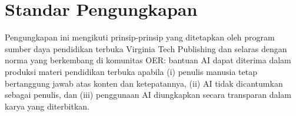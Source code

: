 \section*{Standar Pengungkapan}

Pengungkapan ini mengikuti prinsip-prinsip yang ditetapkan oleh program
sumber daya pendidikan terbuka Virginia Tech Publishing dan selaras dengan
norma yang berkembang di komunitas OER: bantuan AI dapat diterima dalam
produksi materi pendidikan terbuka apabila (i) penulis manusia tetap
bertanggung jawab atas konten dan ketepatannya, (ii) AI tidak dicantumkan
sebagai penulis, dan (iii) penggunaan AI diungkapkan secara transparan dalam
karya yang diterbitkan.

\cleardoublepage

